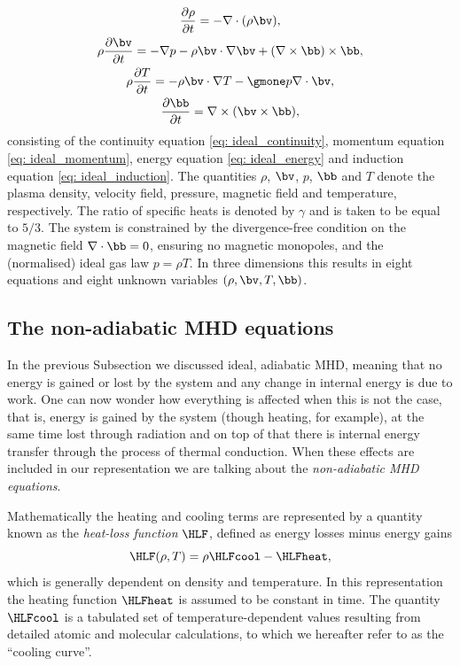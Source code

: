 \begin{gather}
  \frac{\partial \rho}{\partial t} = -\nabla \cdot (\rho \bv), \label{eq: ideal_continuity} \\
  \rho \frac{\partial \bv}{\partial t} =
    -\nabla p
    - \rho \bv \cdot \nabla \bv
    + (\nabla \times \bb) \times \bb, \label{eq: ideal_momentum}\\
  \rho \frac{\partial T}{\partial t} =
    -\rho \bv \cdot \nabla T
    -\gmone p \nabla \cdot \bv, \label{eq: ideal_energy} \\
  \frac{\partial \bb}{\partial t} = \nabla \times (\bv \times \bb), \label{eq: ideal_induction}
\end{gather}
consisting of the continuity equation \eqref{eq: ideal_continuity}, momentum equation \eqref{eq: ideal_momentum}, energy equation \eqref{eq: ideal_energy} and induction equation \eqref{eq: ideal_induction}. The quantities $\rho$, $\bv$, $p$, $\bb$ and $T$ denote the plasma density, velocity field, pressure, magnetic field and temperature, respectively. The ratio of specific heats is denoted by $\gamma$ and is taken to be equal to $5/3$. The system is constrained by the divergence-free condition on the magnetic field $\nabla \cdot \bb = 0$, ensuring no magnetic monopoles, and the (normalised) ideal gas law $p = \rho T$. In three dimensions this results in eight equations and eight unknown variables $(\rho, \bv, T, \bb)$.

\subsection{The non-adiabatic MHD equations}
In the previous Subsection we discussed ideal, adiabatic MHD, meaning that no energy is gained or lost by the system and any change in internal energy is due to work. One can now wonder how everything is affected when this is not the case, that is, energy is gained by the system (though heating, for example), at the same time lost through radiation and on top of that there is internal energy transfer through the process of thermal conduction. When these effects are included in our representation we are talking about the \emph{non-adiabatic MHD equations}.

Mathematically the heating and cooling terms are represented by a quantity known as the \emph{heat-loss function} $\HLF$, defined as energy losses minus energy gains
\begin{equation} \label{eq: cooling_simple}
  \HLF(\rho, T) = \rho \HLFcool - \HLFheat,
\end{equation}
which is generally dependent on density and temperature. In this representation the heating function $\HLFheat$ is assumed to be constant in time. The quantity $\HLFcool$ is a tabulated set of temperature-dependent values resulting from detailed atomic and molecular calculations, to which we hereafter refer to as the ``cooling curve''.

